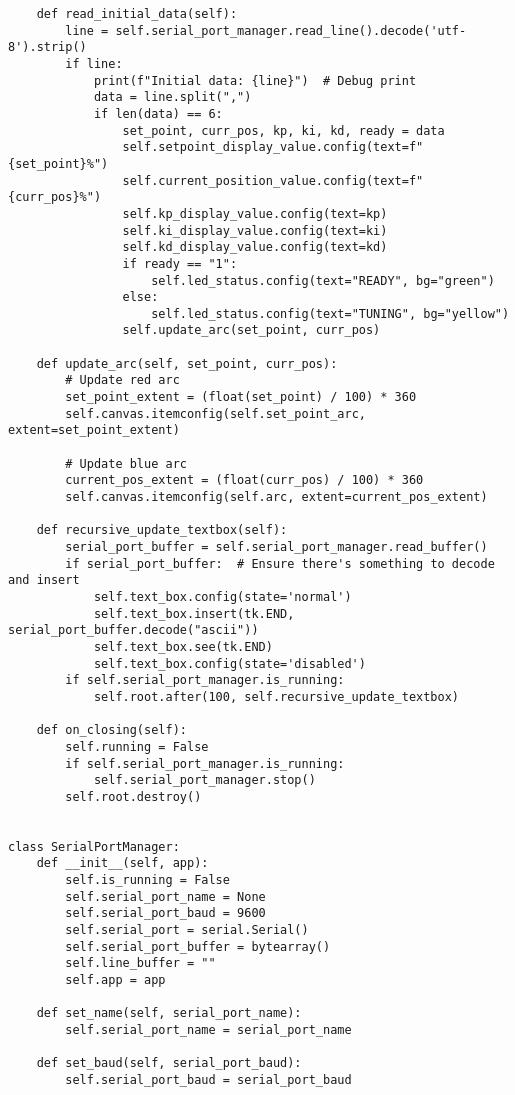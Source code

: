 \documentclass{article}
\begin{document}
\begin{verbatim}
    def read_initial_data(self):
        line = self.serial_port_manager.read_line().decode('utf-8').strip()
        if line:
            print(f"Initial data: {line}")  # Debug print
            data = line.split(",")
            if len(data) == 6:
                set_point, curr_pos, kp, ki, kd, ready = data
                self.setpoint_display_value.config(text=f"{set_point}%")
                self.current_position_value.config(text=f"{curr_pos}%")
                self.kp_display_value.config(text=kp)
                self.ki_display_value.config(text=ki)
                self.kd_display_value.config(text=kd)
                if ready == "1":
                    self.led_status.config(text="READY", bg="green")
                else:
                    self.led_status.config(text="TUNING", bg="yellow")
                self.update_arc(set_point, curr_pos)

    def update_arc(self, set_point, curr_pos):
        # Update red arc
        set_point_extent = (float(set_point) / 100) * 360
        self.canvas.itemconfig(self.set_point_arc, extent=set_point_extent)

        # Update blue arc
        current_pos_extent = (float(curr_pos) / 100) * 360
        self.canvas.itemconfig(self.arc, extent=current_pos_extent)

    def recursive_update_textbox(self):
        serial_port_buffer = self.serial_port_manager.read_buffer()
        if serial_port_buffer:  # Ensure there's something to decode and insert
            self.text_box.config(state='normal')
            self.text_box.insert(tk.END, serial_port_buffer.decode("ascii"))
            self.text_box.see(tk.END)
            self.text_box.config(state='disabled')
        if self.serial_port_manager.is_running:
            self.root.after(100, self.recursive_update_textbox)

    def on_closing(self):
        self.running = False
        if self.serial_port_manager.is_running:
            self.serial_port_manager.stop()
        self.root.destroy()


class SerialPortManager:
    def __init__(self, app):
        self.is_running = False
        self.serial_port_name = None
        self.serial_port_baud = 9600
        self.serial_port = serial.Serial()
        self.serial_port_buffer = bytearray()
        self.line_buffer = ""
        self.app = app

    def set_name(self, serial_port_name):
        self.serial_port_name = serial_port_name

    def set_baud(self, serial_port_baud):
        self.serial_port_baud = serial_port_baud


\end{verbatim}
\end{document}
